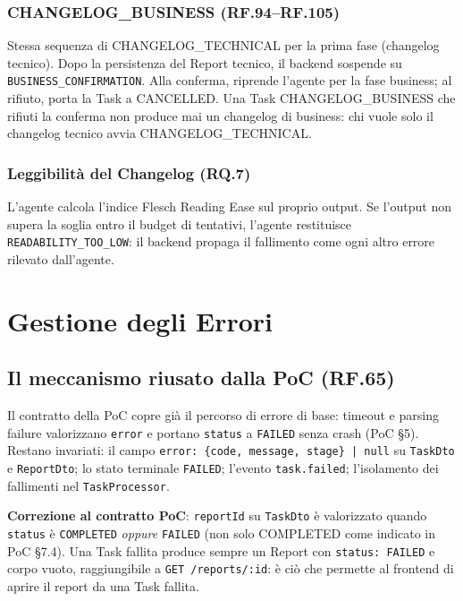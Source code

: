\documentclass[11pt,a4paper]{article}
\begin{document}
\subsubsection{CHANGELOG\_BUSINESS (RF.94--RF.105)}
Stessa sequenza di CHANGELOG\_TECHNICAL per la prima fase (changelog tecnico). Dopo la persistenza del Report tecnico, il backend sospende su \texttt{BUSINESS\_CONFIRMATION}. Alla conferma, riprende l'agente per la fase business; al rifiuto, porta la Task a CANCELLED. Una Task CHANGELOG\_BUSINESS che rifiuti la conferma non produce mai un changelog di business: chi vuole solo il changelog tecnico avvia CHANGELOG\_TECHNICAL.

\subsubsection{Leggibilità del Changelog (RQ.7)}
L'agente calcola l'indice Flesch Reading Ease sul proprio output. Se l'output non supera la soglia entro il budget di tentativi, l'agente restituisce \texttt{READABILITY\_TOO\_LOW}: il backend propaga il fallimento come ogni altro errore rilevato dall'agente.

\section{Gestione degli Errori}
\label{sec:be-errori}

\subsection{Il meccanismo riusato dalla PoC (RF.65)}

Il contratto della PoC copre già il percorso di errore di base: timeout e parsing failure valorizzano \texttt{error} e portano \texttt{status} a \texttt{FAILED} senza crash (PoC §5). Restano invariati: il campo \texttt{error: \{code, message, stage\} | null} su \texttt{TaskDto} e \texttt{ReportDto}; lo stato terminale \texttt{FAILED}; l'evento \texttt{task.failed}; l'isolamento dei fallimenti nel \texttt{TaskProcessor}.

\textbf{Correzione al contratto PoC}: \texttt{reportId} su \texttt{TaskDto} è valorizzato quando \texttt{status} è \texttt{COMPLETED} \emph{oppure} \texttt{FAILED} (non solo COMPLETED come indicato in PoC §7.4). Una Task fallita produce sempre un Report con \texttt{status: FAILED} e corpo vuoto, raggiungibile a \texttt{GET /reports/:id}: è ciò che permette al frontend di aprire il report da una Task fallita.
\end{document}
